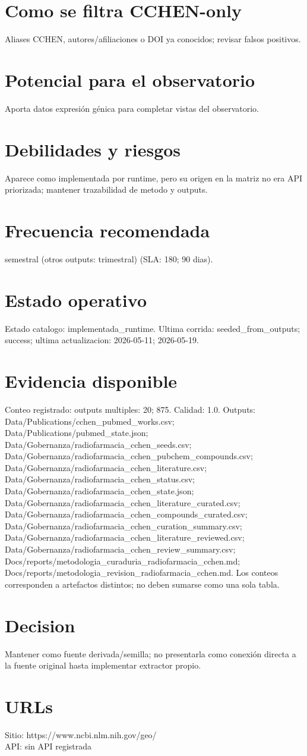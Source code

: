 \documentclass[10pt,a4paper]{article}
\begin{document}
\section*{Como se filtra CCHEN-only}
Aliases CCHEN, autores/afiliaciones o DOI ya conocidos; revisar falsos positivos.

\section*{Potencial para el observatorio}
Aporta datos expresión génica para completar vistas del observatorio.

\section*{Debilidades y riesgos}
Aparece como implementada por runtime, pero su origen en la matriz no era API priorizada; mantener trazabilidad de metodo y outputs.

\section*{Frecuencia recomendada}
semestral (otros outputs: trimestral) (SLA: 180; 90 dias).

\section*{Estado operativo}
Estado catalogo: implementada\_runtime. Ultima corrida: seeded\_from\_outputs; success; ultima actualizacion: 2026-05-11; 2026-05-19.

\section*{Evidencia disponible}
Conteo registrado: outputs multiples: 20; 875. Calidad: 1.0. Outputs: Data/Publications/cchen\_pubmed\_works.csv; Data/Publications/pubmed\_state.json; Data/Gobernanza/radiofarmacia\_cchen\_seeds.csv; Data/Gobernanza/radiofarmacia\_cchen\_pubchem\_compounds.csv; Data/Gobernanza/radiofarmacia\_cchen\_literature.csv; Data/Gobernanza/radiofarmacia\_cchen\_status.csv; Data/Gobernanza/radiofarmacia\_cchen\_state.json; Data/Gobernanza/radiofarmacia\_cchen\_literature\_curated.csv; Data/Gobernanza/radiofarmacia\_cchen\_compounds\_curated.csv; Data/Gobernanza/radiofarmacia\_cchen\_curation\_summary.csv; Data/Gobernanza/radiofarmacia\_cchen\_literature\_reviewed.csv; Data/Gobernanza/radiofarmacia\_cchen\_review\_summary.csv; Docs/reports/metodologia\_curaduria\_radiofarmacia\_cchen.md; Docs/reports/metodologia\_revision\_radiofarmacia\_cchen.md. Los conteos corresponden a artefactos distintos; no deben sumarse como una sola tabla.

\section*{Decision}
Mantener como fuente derivada/semilla; no presentarla como conexión directa a la fuente original hasta implementar extractor propio.


\section*{URLs}
Sitio: https://www.ncbi.nlm.nih.gov/geo/\\
API: sin API registrada
\end{document}
